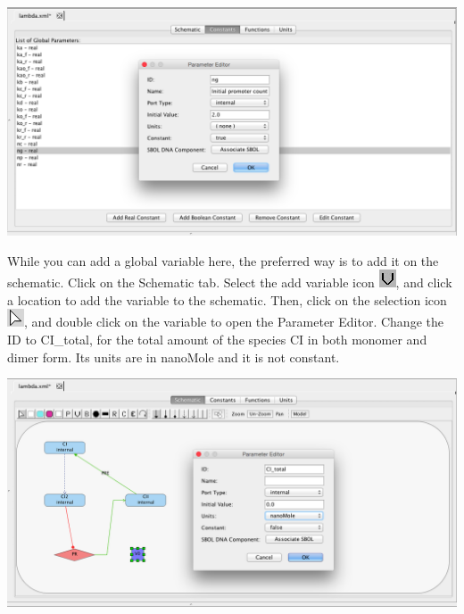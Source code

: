 \documentclass[titlepage,11pt]{article}
\begin{document}
\begin{center}
\includegraphics[width=160mm]{screenshots/GCMparam}
\end{center}

While you can add a global variable here, the preferred way is to add it on the schematic.  Click on the Schematic tab.  Select the add variable icon \includegraphics{../gui/icons/modelview/variable_mode_selected}, and click a location to add the variable to the schematic.  Then, click on the selection icon 
\includegraphics{../gui/icons/modelview/select_mode_selected}, and double click on the variable to open the Parameter Editor.  Change the ID to CI\_total, for the total amount of the species CI in both monomer and dimer form.  Its units are in nanoMole and it is not constant.  

\begin{center}
\includegraphics[width=160mm]{screenshots/parameter}
\end{center}

\end{document}
